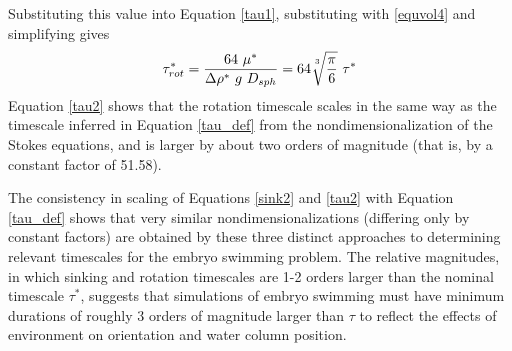 \documentclass[10pt,a4paper]{article}
\begin{document}
Substituting this value into Equation \ref{tau1}, substituting with \ref{equvol4} and simplifying gives
\begin{equation}\label{tau2}
	\tau^*_{rot} = \frac{64 ~ \mu^*}{\Delta \rho^* ~ g ~ D_{sph}} 
	=  64\sqrt[\uproot{5}3]{\frac{\pi}{6}} ~ \tau^*
\end{equation}
Equation \ref{tau2} shows that the rotation timescale scales in the same way as the timescale inferred in Equation \ref{tau_def} from the nondimensionalization of the Stokes equations, and is larger by about two orders of magnitude (that is, by a constant factor of 51.58).

The consistency in scaling of Equations \ref{sink2} and \ref{tau2} with Equation \ref{tau_def} shows that very similar nondimensionalizations (differing only by constant factors) are obtained by these three distinct approaches to determining relevant timescales for the embryo swimming problem.
The relative magnitudes, in which sinking and rotation timescales are 1-2 orders larger than the nominal timescale $\tau^*$, suggests that simulations of embryo swimming must have minimum durations of roughly 3 orders of magnitude larger than $\tau$ to reflect the effects of environment on orientation and water column position.
\end{document}
